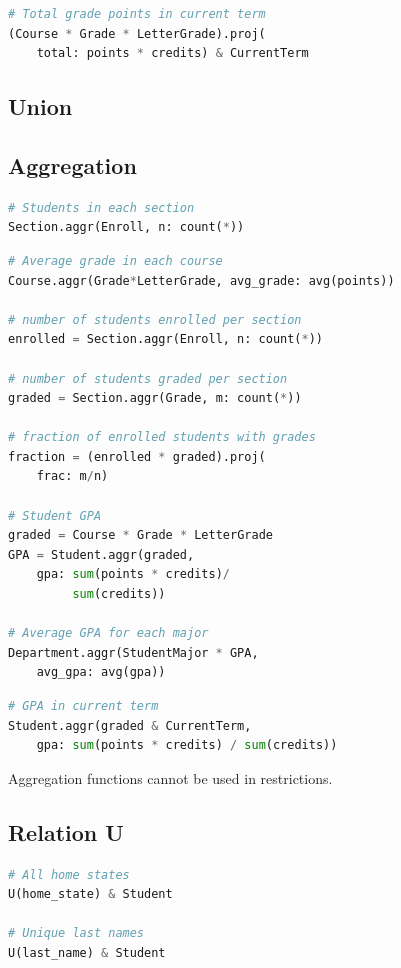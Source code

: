 \documentclass[letter,10pt]{article}
\begin{document}
\begin{lstlisting}[language=Python, caption={}]
# Total grade points in current term
(Course * Grade * LetterGrade).proj(
    total: points * credits) & CurrentTerm
\end{lstlisting}

\subsection{Union}

\subsection{Aggregation}
\begin{lstlisting}[language=Python, caption={Calculate summary statistics.}, label={lst:aggr1}]
# Students in each section
Section.aggr(Enroll, n: count(*))
\end{lstlisting}

\begin{lstlisting}[language=Python, caption={Aggregation in expressions.}, label={lst:aggr2}]
# Average grade in each course
Course.aggr(Grade*LetterGrade, avg_grade: avg(points))

# number of students enrolled per section
enrolled = Section.aggr(Enroll, n: count(*))

# number of students graded per section
graded = Section.aggr(Grade, m: count(*))

# fraction of enrolled students with grades
fraction = (enrolled * graded).proj(
    frac: m/n)

# Student GPA
graded = Course * Grade * LetterGrade
GPA = Student.aggr(graded,
    gpa: sum(points * credits)/
         sum(credits))

# Average GPA for each major
Department.aggr(StudentMajor * GPA, 
    avg_gpa: avg(gpa))
\end{lstlisting}

\begin{lstlisting}[language=Python, caption={Reuse of variables}, label={lst:aggr3}]
# GPA in current term
Student.aggr(graded & CurrentTerm, 
    gpa: sum(points * credits) / sum(credits))
\end{lstlisting}

Aggregation functions cannot be used in restrictions. 
\subsection{Relation U}
\begin{lstlisting}[language=Python, morekeywords={avg, U}, caption={Creating a new entity.}, label={lst:u1}]
# All home states
U(home_state) & Student

# Unique last names
U(last_name) & Student 
\end{lstlisting}
\end{document}
